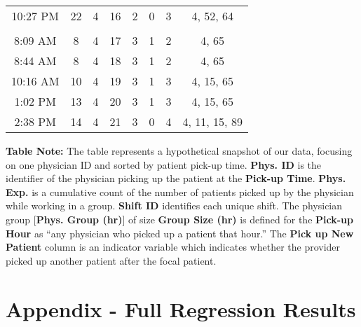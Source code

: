 \begin{table}[htbp]
{\begin{threeparttable}[t]
\begin{tabular}{cccccccc}
    10:27 PM & 22    & 4     & 16    & 2     & 0     & 3     & 4, 52, 64 \\
          &       &       &       &       &       &       &  \\
    8:09 AM & 8     & 4     & 17    & 3     & 1     & 2     & 4, 65 \\
    8:44 AM & 8     & 4     & 18    & 3     & 1     & 2     & 4, 65 \\
    10:16 AM & 10    & 4     & 19    & 3     & 1     & 3     & 4, 15, 65 \\
    1:02 PM & 13    & 4     & 20    & 3     & 1     & 3     & 4, 15, 65 \\
    2:38 PM & 14    & 4     & 21    & 3     & 0     & 4     & 4, 11, 15, 89 \\
    \end{tabular}%
    \medskip
    \begin{tablenotes}
      \footnotesize
      \item \textbf{Table Note:} The table represents a hypothetical snapshot of our data, focusing on one physician ID and sorted by patient pick-up time. \textbf{Phys. ID} is the identifier of the physician picking up the patient at the \textbf{Pick-up Time}. \textbf{Phys. Exp.} is a cumulative count of the number of patients picked up by the physician while working in a group. \textbf{Shift ID} identifies each unique shift. The physician group [\textbf{Phys. Group (hr)}] of size \textbf{Group Size (hr)} is defined for the \textbf{Pick-up Hour} as “any physician who picked up a patient that hour.” The \textbf{Pick up New Patient} column is an indicator variable which indicates whether the provider picked up another patient after the focal patient.
    \end{tablenotes}
  \end{threeparttable} }
 \end{table}

\section{Appendix - Full Regression Results} \label{pu_full_reg}

